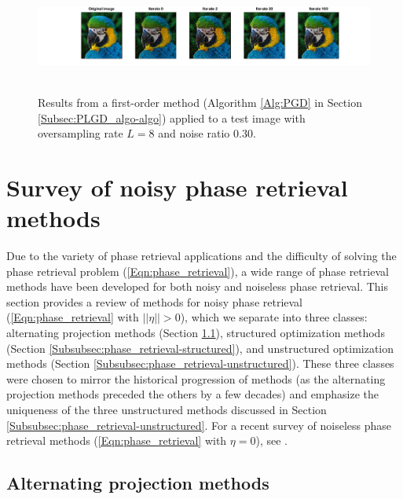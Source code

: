 \begin{figure}[H]
\centering
\hbox{\hspace{-2.3cm} \includegraphics[scale=0.55]{parrot_signal_iterates} }
\caption{Results from a first-order method (Algorithm \ref{Alg:PGD} in Section \ref{Subsec:PLGD_algo-algo}) applied to a test image with oversampling rate $L=8$ and noise ratio $0.30$.}
\label{Fig:parrot_signal_iterates}
\end{figure}




\section{Survey of noisy phase retrieval methods}  	\label{Subsec:phase_retrieval-survey_of_methods}

Due to the variety of phase retrieval applications and the difficulty of solving the phase retrieval problem (\ref{Eqn:phase_retrieval}), a wide range of phase retrieval methods have been developed for both noisy and noiseless phase retrieval.  This section provides a review of methods for noisy phase retrieval (\ref{Eqn:phase_retrieval} with $||\eta|| > 0$), which we separate into three classes: alternating projection methods (Section \ref{Subsubsec:phase_retrieval-alternating_direction_methods}), structured optimization methods (Section \ref{Subsubsec:phase_retrieval-structured}), and unstructured optimization methods (Section \ref{Subsubsec:phase_retrieval-unstructured}).  These three classes were chosen to mirror the historical progression of methods (as the alternating projection methods preceded the others by a few decades) and emphasize the uniqueness of the three unstructured methods discussed in Section \ref{Subsubsec:phase_retrieval-unstructured}.  For a recent survey of noiseless phase retrieval methods (\ref{Eqn:phase_retrieval} with $\eta = 0$), see \cite{DBLP:journals/corr/JaganathanEH15a}.








\subsection{Alternating projection methods}		\label{Subsubsec:phase_retrieval-alternating_direction_methods}



